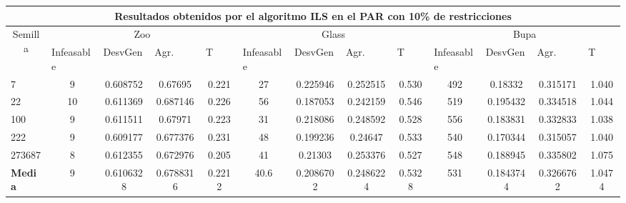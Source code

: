 \begin{table}[H]
	\tiny

	\begin{adjustwidth}{-1cm}{-1cm}%
	
	\begin{tabular}{|l|c|c|c|c|c|c|c|c|c|c|c|c|}
	\hline
	\multicolumn{13}{|c|}{\textbf{Resultados obtenidos por el algoritmo ILS en el PAR con 10\% de restricciones}}                                                                                                                                                                                                                                                                                                                                            \\ \hline
	\multicolumn{1}{|c|}{\multirow{2}{*}{Semilla}} & \multicolumn{4}{c|}{Zoo}                                                                                          & \multicolumn{4}{c|}{Glass}                                                                                         & \multicolumn{4}{c|}{Bupa}                                                                                          \\ \cline{2-13} 
	\multicolumn{1}{|c|}{}                                  & \multicolumn{1}{l|}{Infeasable} & \multicolumn{1}{l|}{DesvGen} & \multicolumn{1}{l|}{Agr.} & \multicolumn{1}{l|}{T} & \multicolumn{1}{l|}{Infeasable} & \multicolumn{1}{l|}{DesvGen} & \multicolumn{1}{l|}{Agr.} & \multicolumn{1}{l|}{T} & \multicolumn{1}{l|}{Infeasable} & \multicolumn{1}{l|}{DesvGen} & \multicolumn{1}{l|}{Agr.} & \multicolumn{1}{l|}{T} \\ \hline
	7   	& 9 & 0.608752 & 0.67695 & 0.221 &  				27 & 0.225946 & 0.252515 & 0.530 &			 	492 & 0.18332 & 0.315171 & 1.040		\\ \hline
	22 		& 10 & 0.611369 & 0.687146 & 0.226 & 				56 & 0.187053 & 0.242159 & 0.546	&		 	519 & 0.195432 & 0.334518 & 1.044		\\ \hline
	100 	& 9 & 0.611511 & 0.67971 & 0.223 & 				31 & 0.218086 & 0.248592 & 0.528	&				556 & 0.183831 & 0.332833 & 1.038		\\ \hline
	222 	& 9 & 0.609177 & 0.677376 & 0.231 &				48 & 0.199236 & 0.24647 & 0.533	 &					540 & 0.170344 & 0.315057 & 1.040		\\ \hline
	273687 	& 8 & 0.612355 & 0.672976 & 0.205 &				41 & 0.21303 & 0.253376 & 0.527		&				548 & 0.188945 & 0.335802 & 1.075		\\ \hline
	\textbf{Media} &  9&	0.6106328	&0.6788316	&0.2212&	40.6	&0.2086702	&0.2486224	&0.5328	&531	&0.1843744	&0.3266762 &	1.0474   \\ \hline
	\end{tabular}
	
	\end{adjustwidth}
	
\end{table}

